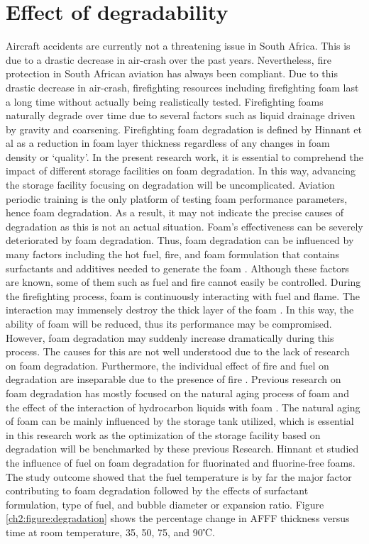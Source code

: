 \section{Effect of degradability}
Aircraft accidents are currently not a threatening issue in South Africa. This is due to a drastic decrease in air-crash over the past years. Nevertheless, fire protection in South African aviation has always been compliant. Due to this drastic decrease in air-crash, firefighting resources including firefighting foam last a long time without actually being realistically tested. Firefighting foams naturally degrade over time due to several factors such as liquid drainage driven by gravity and coarsening. Firefighting foam degradation is defined by Hinnant et al \cite{hinnant2017influence} as a reduction in foam layer thickness regardless of any changes in foam density or ‘quality’.
In the present research work, it is essential to comprehend the impact of different storage facilities on foam degradation. In this way, advancing the storage facility focusing on degradation will be uncomplicated. Aviation periodic training is the only platform of testing foam performance parameters, hence foam degradation. As a result, it may not indicate the precise causes of degradation as this is not an actual situation. Foam’s effectiveness can be severely deteriorated by foam degradation. Thus, foam degradation can be influenced by many factors including the hot fuel, fire, and foam formulation that contains surfactants and additives needed to generate the foam \cite{hinnant2017influence}. Although these factors are known, some of them such as fuel and fire cannot easily be controlled.    
During the firefighting process, foam is continuously interacting with fuel and flame. The interaction may immensely destroy the thick layer of the foam \cite{osei2015foam}. In this way, the ability of foam will be reduced, thus its performance may be compromised. However, foam degradation may suddenly increase dramatically during this process.  The causes for this are not well understood due to the lack of research on foam degradation. Furthermore, the individual effect of fire and fuel on degradation are inseparable due to the presence of fire \cite{hinnant2017influence}. 
Previous research on foam degradation has mostly focused on the natural aging process of foam \cite{do2011numerical} and the effect of the interaction of hydrocarbon liquids with foam \cite{osei2015foam}.  The natural aging of foam can be mainly influenced by the storage tank utilized, which is essential in this research work as the optimization of the storage facility based on degradation will be benchmarked by these previous Research. Hinnant et \cite{hinnant2017influence} studied the influence of fuel on foam degradation for fluorinated and fluorine-free foams. The study outcome showed that the fuel temperature is by far the major factor contributing to foam degradation followed by the effects of surfactant formulation, type of fuel, and bubble diameter or expansion ratio. Figure \ref{ch2:figure:degradation} shows the percentage change in AFFF thickness versus time at room temperature, 35, 50, 75, and 90℃.

